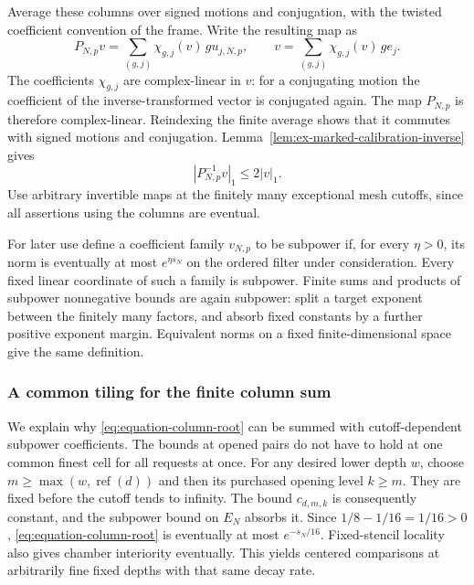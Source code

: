 Average these columns over signed motions and conjugation, with the
twisted coefficient convention of the frame. Write the resulting map
as
\begin{equation}\label{eq:equation-common-calibration}
 P_{N,p}v=\sum_{(g,j)}\chi_{g,j}(v)\,g u_{j,N,p},
 \qquad
 v=\sum_{(g,j)}\chi_{g,j}(v)\,g e_j.
\end{equation}
The coefficients $\chi_{g,j}$ are complex-linear in $v$: for a conjugating
motion the coefficient of the inverse-transformed vector is conjugated
again. The map $P_{N,p}$ is therefore complex-linear. Reindexing the
finite average shows that it commutes with signed motions and conjugation.
Lemma~\ref{lem:ex-marked-calibration-inverse} gives
\begin{equation}\label{eq:equation-inverse-bound}
                       |P_{N,p}^{-1}v|_1\le2|v|_1.
\end{equation}
Use arbitrary invertible maps at the finitely many exceptional mesh
cutoffs, since all assertions using the columns are eventual.

For later use define a coefficient family $v_{N,p}$ to be subpower if,
for every $\eta>0$, its norm is eventually at most $e^{\eta s_N}$ on
the ordered filter under consideration. Every fixed linear coordinate
of such a family is subpower. Finite sums and products of subpower
nonnegative bounds are again subpower: split a target exponent between
the finitely many factors, and absorb fixed constants by a further
positive exponent margin. Equivalent norms on a fixed finite-dimensional
space give the same definition.

\subsubsection{A common tiling for the finite column sum}

We explain why \eqref{eq:equation-column-root} can be summed with
cutoff-dependent subpower coefficients. The bounds at opened pairs do
not have to hold at one common finest cell for all requests at once.
For any desired lower depth $w$, choose $m\ge\max(w,\operatorname{ref}(d))$
and then its purchased opening level $k\ge m$. They are fixed before
the cutoff tends to infinity. The bound $c_{d,m,k}$ is consequently
constant, and the subpower bound on $E_N$ absorbs it. Since
$1/8-1/16=1/16>0$, \eqref{eq:equation-column-root} is eventually at most
$e^{-s_N/16}$. Fixed-stencil locality also gives chamber interiority
eventually. This yields centered comparisons at arbitrarily fine fixed
depths with that same decay rate.

